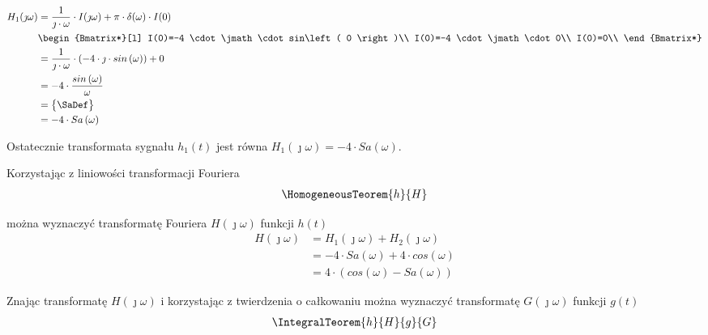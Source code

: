 \begin{task}
\begin{align*}
H_1(\jmath \omega) &= \frac{1}{\jmath \cdot \omega} \cdot I(\jmath \omega) + \pi \cdot \delta(\omega) \cdot I(0)\\
&\begin{Bmatrix*}[l]
I(0)=-4 \cdot \jmath \cdot sin\left( 0 \right)\\
I(0)=-4 \cdot \jmath \cdot 0\\
I(0)=0\\
\end{Bmatrix*}\\
&=\frac{1}{\jmath \cdot \omega} \cdot \left(-4 \cdot \jmath \cdot sin\left( \omega \right)\right) + 0\\
&=-4\cdot \frac{sin\left( \omega \right)}{\omega}\\
&=\begin{Bmatrix}
\SaDef
\end{Bmatrix}\\
&=-4\cdot Sa\left( \omega\right)\\
\end{align*}

Ostatecznie transformata sygnału $h_1(t)$ jest równa $H_1(\jmath \omega)=- 4 \cdot Sa\left( \omega\right)$.

Korzystając z liniowości transformacji Fouriera 
\begin{align*}
\HomogeneousTeorem{h}{H}
\end{align*}

można wyznaczyć transformatę Fouriera $H(\jmath \omega)$ funkcji $h(t)$
\begin{align*}
H(\jmath \omega) &= H_1(\jmath \omega)+H_2(\jmath \omega)\\
&= -4\cdot Sa\left( \omega\right) + 4 \cdot cos\left( \omega \right)\\
&= 4\cdot \left(cos\left( \omega\right) - Sa\left( \omega\right)\right)
\end{align*}

Znając transformatę $H(\jmath \omega)$ i korzystając z twierdzenia o całkowaniu można wyznaczyć transformatę $G(\jmath \omega)$ funkcji $g(t)$
\begin{align*}
\IntegralTeorem{h}{H}{g}{G}
\end{align*}
 

\end{task}

